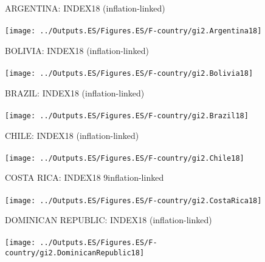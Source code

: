 \documentclass{beamer}
\begin{document}
\begin{frame}
	\begin{figure}
		\centering
		ARGENTINA: INDEX18 (inflation-linked)\\~\\
		\texttt{[image: ../Outputs.ES/Figures.ES/F-country/gi2.Argentina18]}
	\end{figure}
\end{frame}
%
\begin{frame}
	\begin{figure}
		\centering
		BOLIVIA: INDEX18 (inflation-linked)\\~\\
		\texttt{[image: ../Outputs.ES/Figures.ES/F-country/gi2.Bolivia18]}
	\end{figure}
\end{frame}
%
\begin{frame}
	\begin{figure}
		\centering
		BRAZIL: INDEX18 (inflation-linked)\\~\\
		\texttt{[image: ../Outputs.ES/Figures.ES/F-country/gi2.Brazil18]}
	\end{figure}
\end{frame}
%
\begin{frame}
	\begin{figure}
		\centering
		CHILE: INDEX18 (inflation-linked)\\~\\
		\texttt{[image: ../Outputs.ES/Figures.ES/F-country/gi2.Chile18]}
	\end{figure}
\end{frame}
%
\begin{frame}
	\begin{figure}
		\centering
		COSTA RICA: INDEX18 9inflation-linked\\~\\
		\texttt{[image: ../Outputs.ES/Figures.ES/F-country/gi2.CostaRica18]}
	\end{figure}
\end{frame}
%
\begin{frame}
	\begin{figure}
		\centering
		DOMINICAN REPUBLIC: INDEX18 (inflation-linked)\\~\\
		\texttt{[image: ../Outputs.ES/Figures.ES/F-country/gi2.DominicanRepublic18]}
	\end{figure}
\end{frame}
\end{document}
